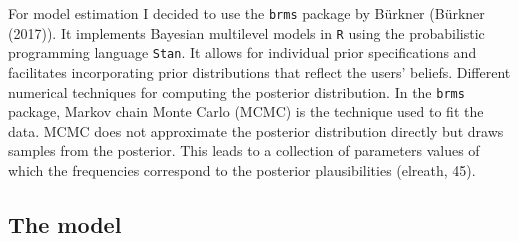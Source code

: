 \documentclass[a4, 12pt]{article}
\begin{document}
\label{ch:estimation}
For model estimation I decided to use the \texttt{brms} package by Bürkner (Bürkner (2017)). It implements Bayesian multilevel models in \texttt{R} using the probabilistic programming language \texttt{Stan}. It allows for individual prior specifications and facilitates incorporating prior distributions that reflect the users' beliefs. Different numerical techniques for computing the posterior distribution. In the \texttt{brms} package, Markov chain Monte Carlo (MCMC) is the technique used to fit the data. MCMC does not approximate the posterior distribution directly but draws samples from the posterior. This leads to a collection of parameters values of which the frequencies correspond to the posterior plausibilities (elreath, 45).

\hypertarget{the-model}{%
\subsection{The model}\label{the-model}}
\end{document}
